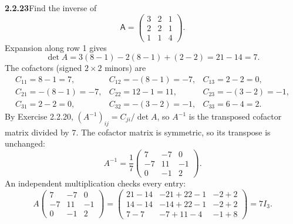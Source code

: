 \par\bigskip
\noindent\textbf{2.2.23}\quad Find the inverse of
\[
\mathsf{A}=\begin{pmatrix}3&2&1\\2&2&1\\1&1&4\end{pmatrix}.
\]
\solution
Expansion along row 1 gives
\[
\det A=3(8-1)-2(8-1)+(2-2)=21-14=7.
\]
The cofactors (signed $2\times2$ minors) are
\[
\begin{array}{lll}
C_{11}=8-1=7,&C_{12}=-(8-1)=-7,&C_{13}=2-2=0,\\
C_{21}=-(8-1)=-7,&C_{22}=12-1=11,&C_{23}=-(3-2)=-1,\\
C_{31}=2-2=0,&C_{32}=-(3-2)=-1,&C_{33}=6-4=2.
\end{array}
\]
By Exercise 2.2.20, $(A^{-1})_{ij}=C_{ji}/\det A$, so $A^{-1}$ is the
transposed cofactor matrix divided by $7$. The cofactor matrix is
symmetric, so its transpose is unchanged:
\[
\boxed{A^{-1}=\frac17
\begin{pmatrix}7&-7&0\\-7&11&-1\\0&-1&2\end{pmatrix}}.
\]
An independent multiplication checks every entry:
\[
A\begin{pmatrix}7&-7&0\\-7&11&-1\\0&-1&2\end{pmatrix}
=\begin{pmatrix}
21-14&-21+22-1&-2+2\\
14-14&-14+22-1&-2+2\\
7-7&-7+11-4&-1+8
\end{pmatrix}=7I_3.
\]

